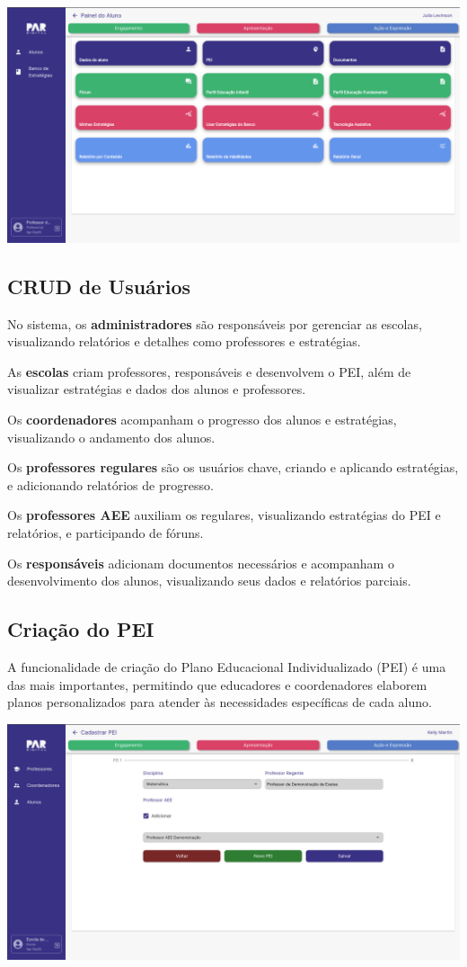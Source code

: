 \documentclass[sigconf]{webmedia}
\begin{document}
\includegraphics[scale=0.12]{./imgs/painel}

\subsection{CRUD de Usuários}
No sistema, os {\bfseries administradores} são responsáveis por gerenciar as
escolas, visualizando relatórios e detalhes como professores e
estratégias.



As {\bfseries escolas}  criam professores, responsáveis e
desenvolvem o PEI, além de visualizar estratégias e dados dos alunos
e professores.

Os {\bfseries coordenadores}  acompanham o progresso dos alunos
e estratégias, visualizando o andamento dos alunos.

Os {\bfseries professores
regulares}  são os usuários chave, criando e aplicando estratégias, e
adicionando relatórios de progresso.

Os {\bfseries professores AEE}  auxiliam
os regulares, visualizando estratégias do PEI e relatórios, e
participando de fóruns.

Os {\bfseries responsáveis}  adicionam documentos
necessários e acompanham o desenvolvimento dos alunos, visualizando
seus dados e relatórios parciais.


\subsection{Criação do PEI}
A funcionalidade de criação do Plano Educacional Individualizado
(PEI) é uma das mais importantes, permitindo que educadores e 
coordenadores elaborem planos personalizados para atender às 
necessidades específicas de cada aluno.
\vspace{0.5cm}

\includegraphics[scale=0.12]{./imgs/pei}
\end{document}
